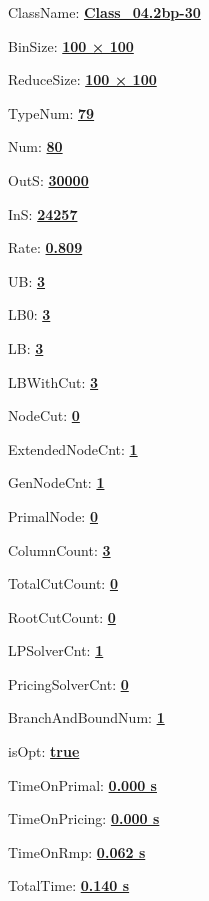 \documentclass[11pt]{article}
\begin{document}
\pagestyle{empty}


ClassName: \underline{\textbf{Class_04.2bp-30}}
\par
BinSize: \underline{\textbf{100 × 100}}
\par
ReduceSize: \underline{\textbf{100 × 100}}
\par
TypeNum: \underline{\textbf{79}}
\par
Num: \underline{\textbf{80}}
\par
OutS: \underline{\textbf{30000}}
\par
InS: \underline{\textbf{24257}}
\par
Rate: \underline{\textbf{0.809}}
\par
UB: \underline{\textbf{3}}
\par
LB0: \underline{\textbf{3}}
\par
LB: \underline{\textbf{3}}
\par
LBWithCut: \underline{\textbf{3}}
\par
NodeCut: \underline{\textbf{0}}
\par
ExtendedNodeCnt: \underline{\textbf{1}}
\par
GenNodeCnt: \underline{\textbf{1}}
\par
PrimalNode: \underline{\textbf{0}}
\par
ColumnCount: \underline{\textbf{3}}
\par
TotalCutCount: \underline{\textbf{0}}
\par
RootCutCount: \underline{\textbf{0}}
\par
LPSolverCnt: \underline{\textbf{1}}
\par
PricingSolverCnt: \underline{\textbf{0}}
\par
BranchAndBoundNum: \underline{\textbf{1}}
\par
isOpt: \underline{\textbf{true}}
\par
TimeOnPrimal: \underline{\textbf{0.000 s}}
\par
TimeOnPricing: \underline{\textbf{0.000 s}}
\par
TimeOnRmp: \underline{\textbf{0.062 s}}
\par
TotalTime: \underline{\textbf{0.140 s}}
\par
\newpage
\end{document}
